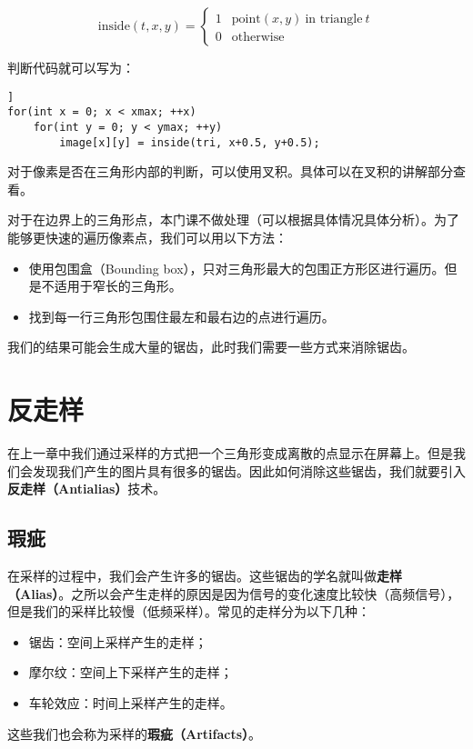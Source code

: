 \documentclass[openany]{progbookcn}
\begin{document}
\begin{equation}
	\text{inside}(t, x, y)=\left\{\begin{matrix}
		1 & \text{point}(x,y)\ \text{in triangle}\ t\\ 
		0 & \text{otherwise}
	\end{matrix}\right.
\end{equation}

判断代码就可以写为：
\begin{lstlisting}]
for(int x = 0; x < xmax; ++x)
	for(int y = 0; y < ymax; ++y)
		image[x][y] = inside(tri, x+0.5, y+0.5);
\end{lstlisting}

对于像素是否在三角形内部的判断，可以使用叉积。具体可以在叉积的讲解部分查看。

对于在边界上的三角形点，本门课不做处理（可以根据具体情况具体分析）。为了能够更快速的遍历像素点，我们可以用以下方法：

\begin{itemize}
	\item 使用包围盒（Bounding box），只对三角形最大的包围正方形区进行遍历。但是不适用于窄长的三角形。
	\item 找到每一行三角形包围住最左和最右边的点进行遍历。
\end{itemize}

我们的结果可能会生成大量的锯齿，此时我们需要一些方式来消除锯齿。

\chapter{反走样}
在上一章中我们通过采样的方式把一个三角形变成离散的点显示在屏幕上。但是我们会发现我们产生的图片具有很多的锯齿。因此如何消除这些锯齿，我们就要引入\textbf{反走样（Antialias）}技术。

\section{瑕疵}
在采样的过程中，我们会产生许多的锯齿。这些锯齿的学名就叫做\textbf{走样（Alias）}。之所以会产生走样的原因是因为信号的变化速度比较快（高频信号），但是我们的采样比较慢（低频采样）。常见的走样分为以下几种：
\begin{itemize}
	\item 锯齿：空间上采样产生的走样；
	\item 摩尔纹：空间上下采样产生的走样；
	\item 车轮效应：时间上采样产生的走样。
\end{itemize}
这些我们也会称为采样的\textbf{瑕疵（Artifacts）}。
\end{document}
